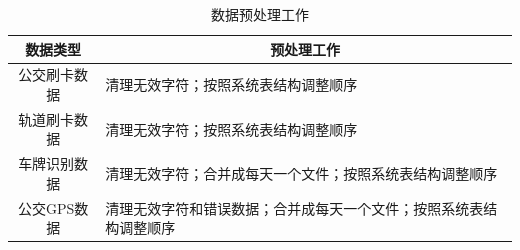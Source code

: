 \begin{table}[ht]\centering
  \renewcommand\tabularxcolumn[1]{m{#1}}
  \caption{数据预处理工作\label{tbl:数据预处理工作}} 
  \begin{tabularx}{\textwidth}{|c|X|}
    \hline
    {\bfseries 数据类型} & \multicolumn{1}{c|}{\bfseries{预处理工作}}\\\hline
     公交刷卡数据 & 清理无效字符；按照系统表结构调整顺序\\\hline
     轨道刷卡数据 & 清理无效字符；按照系统表结构调整顺序\\\hline
     车牌识别数据 & 清理无效字符；合并成每天一个文件；按照系统表结构调整顺序\\\hline
     公交GPS数据 & 清理无效字符和错误数据；合并成每天一个文件；按照系统表结构调整顺序\\
    \hline
  \end{tabularx}
\end{table}



